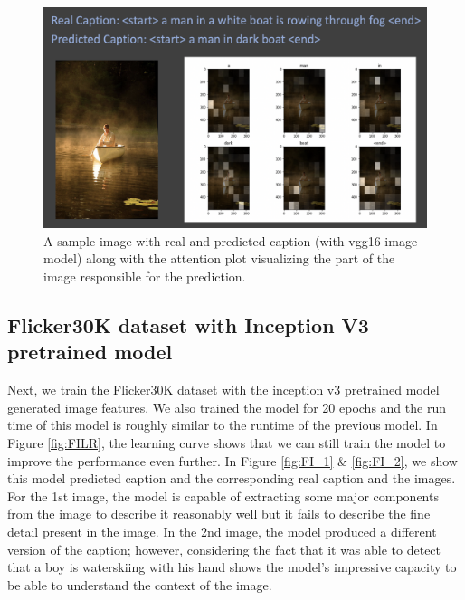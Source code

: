 \documentclass[12pt]{article}
\begin{document}
\begin{figure}[h!]
\begin{center}
\includegraphics[width=7in]{FV_1.png}
\end{center}
\caption{\label{fig:FV_1}
A sample image with real and predicted caption (with vgg16 image model) along with the attention plot visualizing the part of the image responsible for the prediction.}
\end{figure}

\subsection{Flicker30K dataset with Inception V3 pretrained model}
\label{sec:imfeat}

Next, we train the Flicker30K dataset with the inception v3 pretrained model generated image features. We also trained the model for 20 epochs and the run time of this model is roughly similar to the runtime of the previous model. In Figure \ref{fig:FILR}, the learning curve shows that we can still train the model to improve the performance even further. In Figure \ref{fig:FI_1} & \ref{fig:FI_2}, we show this model predicted caption and the corresponding real caption and the images. For the 1st image, the model is capable of extracting some major components from the image to describe it reasonably well but it fails to describe the fine detail present in the image. In the 2nd image, the model produced a different version of the caption; however, considering the fact that it was able to detect that a boy is waterskiing with his hand shows the model's impressive capacity to be able to understand the context of the image.
\end{document}
